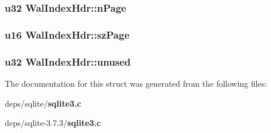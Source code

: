 \subsubsection{\setlength{\rightskip}{0pt plus 5cm}\bf{u32} \bf{Wal\-Index\-Hdr::n\-Page}}\label{structWalIndexHdr_323308068512262081e932dd2e5beba6}


\subsubsection{\setlength{\rightskip}{0pt plus 5cm}\bf{u16} \bf{Wal\-Index\-Hdr::sz\-Page}}\label{structWalIndexHdr_0a52f26b5a09775ab224726c9a60fef3}


\subsubsection{\setlength{\rightskip}{0pt plus 5cm}\bf{u32} \bf{Wal\-Index\-Hdr::unused}}\label{structWalIndexHdr_af5925f09a3380ef0decaf9c1b4ae214}




The documentation for this struct was generated from the following files:\begin{CompactItemize}
\item 
deps/sqlite/\bf{sqlite3.c}\item 
deps/sqlite-3.7.3/\bf{sqlite3.c}\end{CompactItemize}
